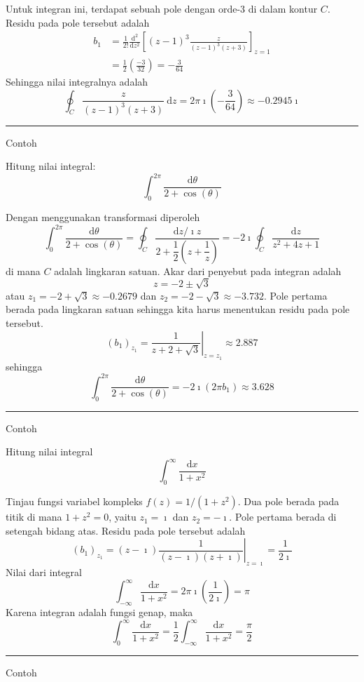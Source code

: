 Untuk integran ini, terdapat sebuah pole dengan orde-3 di dalam kontur
$C$. Residu pada pole tersebut adalah
\begin{align*}
b_{1} & =\frac{1}{2!}\frac{\mathrm{d}^{2}}{\mathrm{d}z^{2}}\left[(z-1)^{3}\frac{z}{(z-1)^{3}(z+3)}\right]_{z=1}\\
 & =\frac{1}{2}\left(\frac{-3}{32}\right)=-\frac{3}{64}
\end{align*}
Sehingga nilai integralnya adalah
\[
\oint_{C}\frac{z}{(z-1)^{3}(z+3)}\ \mathrm{d}z=2\pi\imath\left(-\frac{3}{64}\right)\approx-0.2945\imath
\]

\rule[0.5ex]{1\columnwidth}{1pt}

Contoh

Hitung nilai integral:
\[
\int_{0}^{2\pi}\frac{\mathrm{d}\theta}{2+\cos(\theta)}
\]

Dengan menggunakan transformasi diperoleh
\[
\int_{0}^{2\pi}\frac{\mathrm{d}\theta}{2+\cos(\theta)}=\oint_{C}\frac{\mathrm{d}z/\imath z}{2+\dfrac{1}{2}\left(z+\dfrac{1}{z}\right)}=-2\imath\oint_{C}\frac{\mathrm{d}z}{z^{2}+4z+1}
\]
di mana $C$ adalah lingkaran satuan. Akar dari penyebut pada integran
adalah
\[
z=-2\pm\sqrt{3}
\]
atau $z_{1}=-2+\sqrt{3}\approx-0.2679$ dan $z_{2}=-2-\sqrt{3}\approx-3.732$.
Pole pertama berada pada lingkaran satuan sehingga kita harus menentukan
residu pada pole tersebut.
\[
\left(b_{1}\right)_{z_{1}}=\left.\frac{1}{z+2+\sqrt{3}}\right|_{z=z_{1}}\approx2.887
\]
sehingga
\[
\int_{0}^{2\pi}\frac{\mathrm{d}\theta}{2+\cos(\theta)}=-2\imath\left(2\pi b_{1}\right)\approx3.628
\]

\rule[0.5ex]{1\columnwidth}{1pt}

Contoh

Hitung nilai integral
\[
\int_{0}^{\infty}\frac{\mathrm{d}x}{1+x^{2}}
\]

Tinjau fungsi variabel kompleks $f(z)=1/(1+z^{2})$. Dua pole berada
pada titik di mana $1+z^{2}=0$, yaitu $z_{1}=\imath$ dan $z_{2}=-\imath$.
Pole pertama berada di setengah bidang atas. Residu pada pole tersebut
adalah
\[
\left(b_{1}\right)_{z_{1}}=\left.(z-\imath)\frac{1}{(z-\imath)(z+\imath)}\right|_{z=\imath}=\frac{1}{2\imath}
\]
Nilai dari integral
\[
\int_{-\infty}^{\infty}\frac{\mathrm{d}x}{1+x^{2}}=2\pi\imath\left(\frac{1}{2\imath}\right)=\pi
\]
Karena integran adalah fungsi genap, maka
\[
\int_{0}^{\infty}\frac{\mathrm{d}x}{1+x^{2}}=\frac{1}{2}\int_{-\infty}^{\infty}\frac{\mathrm{d}x}{1+x^{2}}=\frac{\pi}{2}
\]

\rule[0.5ex]{1\columnwidth}{1pt}

Contoh

